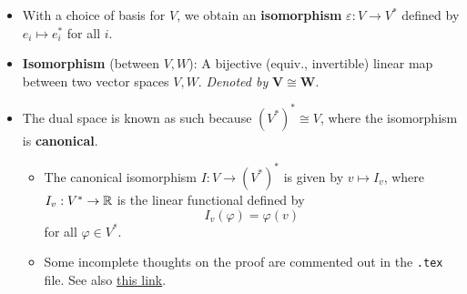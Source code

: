 \documentclass[../notes.tex]{subfiles}
\begin{document}
\begin{itemize}
\begin{itemize}
\begin{itemize}
        \end{itemize}
    \end{itemize}
    \item With a choice of basis for $V$, we obtain an \textbf{isomorphism} $\varepsilon:V\to V^*$ defined by $e_i\mapsto e_i^*$ for all $i$.
    \item \textbf{Isomorphism} (between $V,W$): A bijective (equiv., invertible) linear map between two vector spaces $V,W$. \emph{Denoted by} $\bm{V\cong W}$.
    \item The dual space is known as such because $(V^*)^*\cong V$, where the isomorphism is \textbf{canonical}.
    \begin{itemize}
        \item The canonical isomorphism $I:V\to(V^*)^*$ is given by $v\mapsto I_v$, where $I_v:V^*\to\mathbb{R}$ is the linear functional defined by
        \begin{equation*}
            I_v(\varphi) = \varphi(v)
        \end{equation*}
        for all $\varphi\in V^*$.
        \item Some incomplete thoughts on the proof are commented out in the \verb|.tex| file. See also \href{https://math.stackexchange.com/q/763199/340652}{this link}.

\end{itemize}
\end{itemize}
\end{document}
